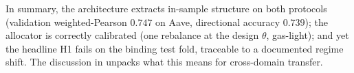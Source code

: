 In summary, the architecture extracts in-sample structure on both
protocols (validation weighted-Pearson $0.747$ on Aave, directional
accuracy $0.739$); the allocator is correctly calibrated (one rebalance
at the design $\theta$, gas-light); and yet the headline H1 fails on
the binding test fold, traceable to a documented regime shift. The
discussion in  unpacks what this means for
cross-domain transfer.
